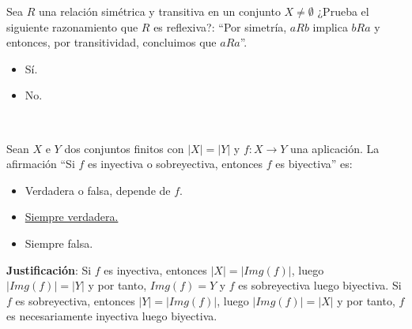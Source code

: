 \begin{ejercicio}
    Sea $R$ una relación simétrica y transitiva en un conjunto $X \neq \emptyset$ ¿Prueba el siguiente razonamiento que $R$ es reflexiva?:\newline
    ``Por simetría, $aRb$ implica $bRa$ y entonces, por transitividad, concluimos que $aRa$''.
    \begin{itemize}
        \item Sí.
        \item No.
    \end{itemize}
\end{ejercicio}

\newpage
\ %
\resetearcontador

\begin{ejercicio}
    Sean $X$ e $Y$ dos conjuntos finitos con $|X| = |Y|$ y $f:X \rightarrow Y$ una aplicación. La afirmación ``Si $f$ es inyectiva o sobreyectiva, entonces $f$ es biyectiva'' es:
    \begin{itemize}
        \item Verdadera o falsa, depende de $f$.
        \item \underline{Siempre verdadera.}
        \item Siempre falsa.
    \end{itemize}

    \noindent
    \textbf{Justificación}:
    Si $f$ es inyectiva, entonces $|X| = |Img(f)|$, luego $|Img(f)| = |Y|$ y por tanto, $Img(f) = Y$ y $f$ es sobreyectiva luego biyectiva.\newline
    Si $f$ es sobreyectiva, entonces $|Y|=|Img(f)|$, luego $|Img(f)| = |X|$ y por tanto, $f$ es necesariamente inyectiva luego biyectiva.
\end{ejercicio}

